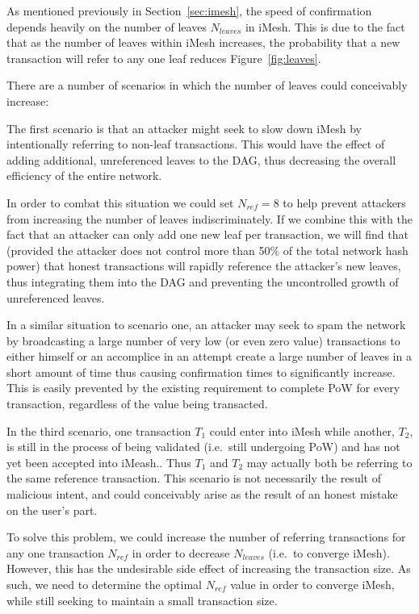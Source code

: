 \documentclass[a4paper,10pt,twocolumn]{article}
\begin{document}
As mentioned previously in Section~\ref{sec:imesh}, the speed of confirmation
depends heavily on the number of leaves \( N_{leaves} \) in iMesh. This is due to the fact that as the number of leaves within iMesh increases,
the probability that a new transaction will refer to any one leaf reduces Figure~\ref{fig:leaves}.

There are a number of scenarios in which the number of leaves could conceivably increase:

The first scenario is that an attacker might seek to slow down iMesh by intentionally referring to non-leaf transactions.
This would have the effect of adding additional, unreferenced leaves to the DAG, thus decreasing the overall efficiency of the entire network.

In order to combat this situation we could set \( N_{ref}=8\) to help prevent attackers from increasing the number of leaves indiscriminately.
If we combine this with the fact that an attacker can only add one new leaf per transaction, we will find that (provided the attacker does not control more than 50\% of the total network hash power) that honest transactions will rapidly 
reference the attacker's new leaves, thus integrating them into the DAG and preventing the uncontrolled growth of unreferenced leaves.

In a similar situation to scenario one, an attacker may seek to spam the network by broadcasting a large number of very low (or even zero value) transactions to either himself or an accomplice in an attempt create a large number of leaves in a short 
amount of time thus causing confirmation times to significantly increase. This is easily prevented by the existing requirement to complete PoW for every transaction, regardless of the value being transacted.

In the third scenario, one transaction \(T_1\) could enter into iMesh while another, \(T_2\), is still in the process of being validated (i.e.\ still undergoing PoW) and has not yet been accepted into iMeash..
Thus \(T_1\) and \(T_2\) may actually both be referring to the same reference transaction.
This scenario is not necessarily the result of malicious intent, and could conceivably arise as the result of an honest mistake on the user's part.

To solve this problem, we could increase the number of referring transactions for any one transaction \( N_{ref} \) in order 
to decrease \( N _{leaves} \) (i.e.\ to converge iMesh). However, this has the undesirable side effect of increasing the transaction size.
As such, we need to determine the optimal \( N_{ref} \) value in order to converge iMesh, while still seeking to maintain a small transaction size. 
\end{document}
